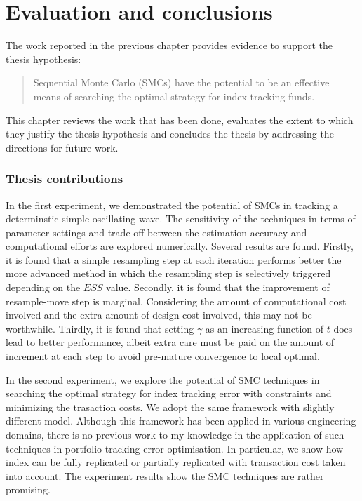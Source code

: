 \chapter{Evaluation and conclusions}
\graphicspath{{Chapter5/figures/}}
\label{EvaluationAndConclusion}
The work reported in the previous chapter provides evidence to support
the thesis hypothesis:
\begin{quote}
Sequential Monte Carlo (SMCs) have the potential to be an effective means of searching the optimal strategy for index tracking funds.
\end{quote}
This chapter reviews the work that has been done, evaluates the extent
to which they justify the thesis hypothesis and concludes the thesis
by addressing the directions for future work.

\subsection{Thesis contributions}
In the first experiment, we demonstrated the potential of SMCs in tracking a determinstic simple oscillating wave. The sensitivity of the techniques in terms of parameter settings and trade-off between the estimation accuracy and computational efforts are explored numerically. Several results are found. Firstly, it is found that a simple resampling step at each iteration performs better the more advanced method in which the resampling step is selectively triggered depending on the $ESS$ value. Secondly, it is found that the improvement of resample-move step is marginal. Considering the amount of computational cost involved and the extra amount of design cost involved, this may not be worthwhile. Thirdly, it is found that setting $\gamma$ as an increasing function of $t$ does lead to better performance, albeit extra care must be paid on the amount of increment at each step to avoid pre-mature convergence to local optimal. 

In the second experiment, we explore the potential of SMC techniques in searching the optimal strategy for index tracking error with constraints and minimizing the trasaction costs. We adopt the same framework with slightly different model. Although this framework has been applied in various engineering domains, there is no previous work to my knowledge in the application of such techniques in portfolio tracking error optimisation. In particular, we show how index can be fully replicated or partially replicated with transaction cost taken into account. The experiment results show the SMC techniques are rather promising.

